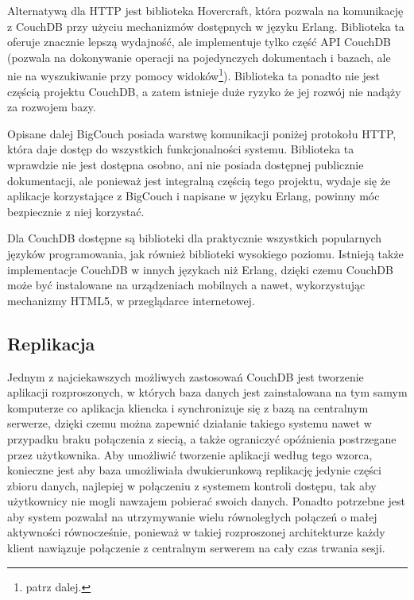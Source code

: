 Alternatywą dla HTTP jest biblioteka Hovercraft, która pozwala na komunikację z CouchDB przy użyciu mechanizmów dostępnych w języku Erlang.
Biblioteka ta oferuje znacznie lepszą wydajność, ale implementuje tylko część API CouchDB (pozwala na dokonywanie operacji na pojedynczych dokumentach i bazach, ale nie na wyszukiwanie przy pomocy widoków\footnote{patrz dalej.}).
Biblioteka ta ponadto nie jest częścią projektu CouchDB, a zatem istnieje duże ryzyko że jej rozwój nie nadąży za rozwojem bazy.

Opisane dalej BigCouch posiada warstwę komunikacji poniżej protokołu HTTP, która daje dostęp do wszystkich funkcjonalności systemu.
Biblioteka ta wprawdzie nie jest dostępna osobno, ani nie posiada dostępnej publicznie dokumentacji, ale ponieważ jest integralną częścią tego projektu, wydaje się że aplikacje korzystające z BigCouch i napisane w języku Erlang, powinny móc bezpiecznie z niej korzystać.

Dla CouchDB dostępne są biblioteki dla praktycznie wszystkich popularnych języków programowania, jak również biblioteki wysokiego poziomu.
Istnieją także implementacje CouchDB w innych językach niż Erlang, dzięki czemu CouchDB może być instalowane na urządzeniach mobilnych a nawet, wykorzystując mechanizmy HTML5, w przeglądarce internetowej.

\subsection*{Replikacja}


Jednym z najciekawszych możliwych zastosowań CouchDB jest tworzenie aplikacji rozproszonych, w których baza danych jest zainstalowana na tym samym komputerze co aplikacja kliencka i synchronizuje się z bazą na centralnym serwerze, dzięki czemu można zapewnić działanie takiego systemu nawet w przypadku braku połączenia z siecią, a także ograniczyć opóźnienia postrzegane przez użytkownika.
Aby umożliwić tworzenie aplikacji według tego wzorca, konieczne jest aby baza umożliwiała dwukierunkową replikację jedynie części zbioru danych, najlepiej w połączeniu z systemem kontroli dostępu, tak aby użytkownicy nie mogli nawzajem pobierać swoich danych.
Ponadto potrzebne jest aby system pozwalał na utrzymywanie wielu równoległych połączeń o małej aktywności równocześnie, ponieważ w takiej rozproszonej architekturze każdy klient nawiązuje połączenie z centralnym serwerem na cały czas trwania sesji.

